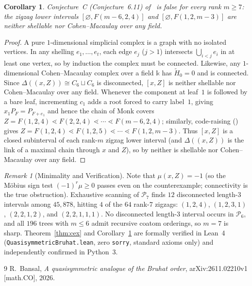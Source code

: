 \documentclass[11pt]{article}
\newtheorem{corollary}[theorem]{Corollary}
\theoremstyle{remark}
\newtheorem{remark}[theorem]{Remark}
\begin{document}
\begin{corollary}\label{cor:disproof}
Conjecture~C (Conjecture~6.11) of~\cite{Bansal2026} is false for every rank $m \ge 7$: the zigzag lower intervals $[\varnothing, F(m - 6, 2, 4)]$ and $[\varnothing, F(1, 2, m - 3)]$ are neither shellable nor Cohen--Macaulay over any field.
\end{corollary}

\begin{proof}
A pure $1$-dimensional simplicial complex is a graph with no isolated vertices. In any shelling $e_1, \dots, e_t$, each edge $e_j$ ($j > 1$) intersects $\bigcup_{i < j} e_i$ in at least one vertex, so by induction the complex must be connected. Likewise, any $1$-dimensional Cohen--Macaulay complex over a field $\mathbb{k}$ has $\widetilde{H}_0 = 0$ and is connected. Since $\Delta((x, Z)) \cong C_6 \sqcup C_6$ is disconnected, $[x, Z]$ is neither shellable nor Cohen--Macaulay over any field. Whenever the component at leaf~$1$ is followed by a bare leaf, incrementing $c_1$ adds a root forced to carry label~$1$, giving $x_1 P_F = P_{F + e_1}$ and hence the chain of Monk covers $Z = F(1, 2, 4) \lessdot F(2, 2, 4) \lessdot \cdots \lessdot F(m - 6, 2, 4)$; similarly, code-raising (\cite[Lemma~3.1]{Bansal2026}) gives $Z = F(1, 2, 4) \lessdot F(1, 2, 5) \lessdot \cdots \lessdot F(1, 2, m - 3)$. Thus $[x, Z]$ is a closed subinterval of each rank-$m$ zigzag lower interval (and $\Delta((x, Z))$ is the link of a maximal chain through $x$ and $Z$), so by \cite[Fact~6.1]{Bansal2026} neither is shellable nor Cohen--Macaulay over any field.
\end{proof}

\begin{remark}[Minimality and Verification]
Note that $\mu(x, Z) = -1$ (so the M\"obius sign test $(-1)^r \mu \ge 0$ passes even on the counterexample; connectivity is the true obstruction). Exhaustive scanning of $\mathcal{P}_7$ finds $12$ disconnected length-$3$ intervals among $45{,}878$, hitting $4$ of the $64$ rank-$7$ zigzags: $(1,2,4)$, $(1,2,3,1)$, $(2,2,1,2)$, and $(2,2,1,1,1)$. No disconnected length-$3$ interval occurs in $\mathcal{P}_6$, and all $196$ trees with $m \le 6$ admit recursive coatom orderings, so $m = 7$ is sharp. Theorem~\ref{thm:cex} and Corollary~\ref{cor:disproof} are formally verified in Lean~4 (\texttt{QuasisymmetricBruhat.lean}, zero \texttt{sorry}, standard axioms only) and independently confirmed in Python~3.
\end{remark}

\begin{thebibliography}{9}
R.~Bansal, \emph{A quasisymmetric analogue of the Bruhat order}, arXiv:2611.02210v1 [math.CO], 2026.
\end{thebibliography}
\end{document}
